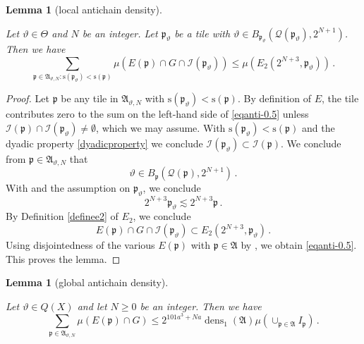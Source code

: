 \documentclass[10pt,a4paper]{article}
\theoremstyle{plain}
\newtheorem{lemma}[theorem]{Lemma}
\theoremstyle{definition}
\numberwithin{equation}{subsection}
\DeclareMathOperator{\dens}{\operatorname{dens}}
\newcommand{\fp}{{\mathfrak p}}
\newcommand{\ps}{{\mathrm{s}}}
\newcommand{\scI}{{\mathcal{I}}} %
\newcommand{\mfa}{{\vartheta}}
\newcommand{\Mf}{{\Theta}}
\newcommand{\fcc}{{\mathcal{Q}}}
\newcommand{\lean}[1]{}
\newcommand{\uses}[1]{}
\newcommand{\leanok}{}
\begin{document}
\begin{lemma}[local antichain density]\label{local-antichain-density}
\leanok
\lean{Antichain.local_antichain_density, Antichain.Ep_inter_G_inter_Ip'_subset_E2}
\uses{tile-disjointness,tile-reach}
Let $\mfa\in\Mf$ and {$N$} be
an integer. Let $\fp_{\mfa}$ be a tile with $\mfa\in B_{\fp_{\mfa}}(\fcc(\fp_{\mfa}), 2^{N+1})$.
Then we have
\begin{equation}\label{eqanti-0.5}
    \sum_{\fp\in\mathfrak{A}_{\mfa,N}: \ps(\fp_{\mfa})<\ps(\fp)}\mu(E(\fp)\cap G \cap \scI(\fp_{\mfa}))
    \le \mu (E_2(2^{N+3},\fp_{\mfa}))
 \, .
\end{equation}



\end{lemma}

\begin{proof}
\leanok

Let $\fp$ be any tile in $\mathfrak{A}_{\mfa,N}$ with $\ps(\fp_{\mfa})<\ps(\fp)$. By definition of
$E$, the tile contributes zero to the sum on the left-hand side of \eqref{eqanti-0.5} unless
 $\scI(\fp)\cap \scI(\fp_{\mfa}) \neq \emptyset$, which we may assume. With $\ps(\fp_{\mfa})<\ps(\fp)$
and the dyadic property
\eqref{dyadicproperty} we conclude $\scI(\fp_{\mfa})\subset \scI(\fp)$.
We conclude from $\fp \in \mathfrak{A}_{\mfa,N}$ that
\begin{equation}
    \mfa \in B_\fp(\fcc(\fp), 2^{N+1})\, .
\end{equation}
With  and the assumption on $\fp_\mfa$, we conclude
\begin{equation}
    2^{N+3}\fp_{\mfa} \lesssim 2^{N+3}\fp \, .
\end{equation}
By Definition \eqref{definee2} of $E_2$, we conclude
\begin{equation}
    E(\fp)\cap G \cap \scI(\fp_{\mfa}) \subset E_2(2^{N+3},\fp_{\mfa})\, .
\end{equation}
Using disjointedness of the various $E(\fp)$ with $\fp\in \mathfrak{A}$ by , we obtain \eqref{eqanti-0.5}.
This proves the lemma.
\end{proof}
\begin{lemma}[global antichain density]
\label{global-antichain-density}
\leanok
\lean{Antichain.global_antichain_density}
\uses{stack-density,local-antichain-density}
Let $\mfa\in Q(X)$ and let $N\ge 0$ be
an integer. Then we have
\begin{equation}\label{eqanti00}
    \sum_{\fp\in\mathfrak{A}_{\mfa,N}}\mu(E(\fp)\cap G)
    \le
 2^{101a^3+Na}\dens_1(\mathfrak{A})\mu\left(\cup_{\fp\in\mathfrak{A}}I_{\fp}\right)\, .
\end{equation}
\end{lemma}
\end{document}
